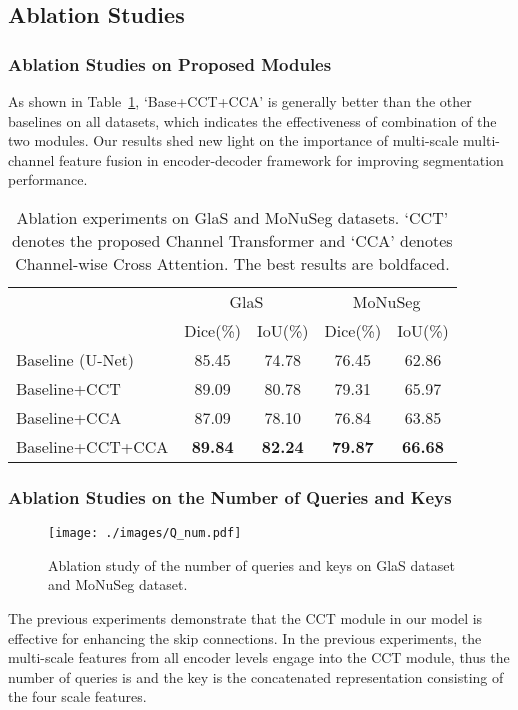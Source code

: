 \documentclass[letterpaper]{article} \usepackage{aaai22}  \usepackage{times}  \usepackage{helvet}  \usepackage{courier}  \usepackage[hyphens]{url}  \usepackage{graphicx} \urlstyle{rm} \def\UrlFont{\rm}  \usepackage{natbib}  \usepackage{caption} \DeclareCaptionStyle{ruled}{labelfont=normalfont,labelsep=colon,strut=off} \frenchspacing  \setlength{\pdfpagewidth}{8.5in}  \setlength{\pdfpageheight}{11in}  \usepackage{algorithm}
\begin{document}
	
	
	
	
	
	
	
	
	\subsection{Ablation Studies}
	
	\subsubsection{Ablation Studies on Proposed Modules}
	As shown in Table~\ref{ablation}, `Base+CCT+CCA' is generally better than the other baselines on all datasets, which indicates the effectiveness of combination of the two modules.
	Our results shed new light on the importance of multi-scale multi-channel feature fusion in encoder-decoder framework for improving segmentation performance.
	
	\begin{table}[]
		\centering
		\footnotesize
		\begin{tabular}{@{}lcccc@{}}
			\toprule
			\small
			\multirow{2}{*}{Method} & \multicolumn{2}{c}{GlaS} & \multicolumn{2}{c}{MoNuSeg} \\ \cmidrule(l){2-5} 
			& Dice(\%)     & IoU(\%)    & Dice(\%)      & IoU(\%)     \\ \midrule
			Baseline (U-Net)             & 85.45        & 74.78      & 76.45         & 62.86       \\
			Baseline+CCT                 & 89.09        & 80.78      & 79.31         & 65.97       \\
			Baseline+CCA                & 87.09        & 78.10      & 76.84         & 63.85       \\
			Baseline+CCT+CCA             & \textbf{89.84}        & \textbf{82.24}      & \textbf{79.87}         & \textbf{66.68}     \\ \bottomrule
		\end{tabular}
		\caption{Ablation experiments on GlaS and MoNuSeg datasets. `CCT' denotes the proposed Channel Transformer and `CCA' denotes Channel-wise Cross Attention. The best results are boldfaced.}
		\label{ablation}
	\end{table}
	
	
	\subsubsection{Ablation Studies on the Number of Queries and Keys}
	\begin{figure}[!t]
		\centering
		\texttt{[image: ./images/Q\_num.pdf]} \caption{Ablation study of the number of queries and keys on GlaS dataset and MoNuSeg dataset.}
		\label{Qnum}
	\end{figure}
	The previous experiments demonstrate that the CCT module in our model is effective for enhancing the skip connections. 
	In the  previous experiments,  the multi-scale features from all encoder levels engage into the CCT module, thus the number of queries is  and the key is the concatenated representation consisting of the four scale features.
	
\end{document}
